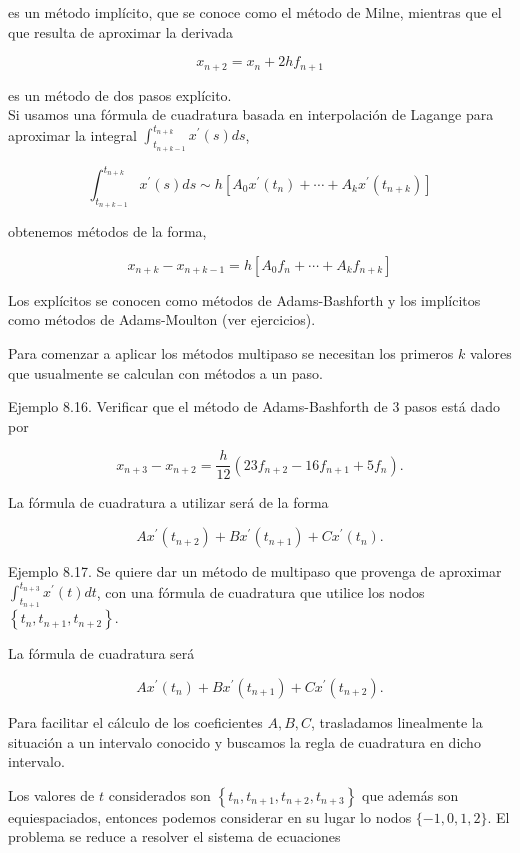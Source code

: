 \documentclass[10pt]{book}
\begin{document}
es un método implícito, que se conoce como el método de Milne, mientras que el que resulta de aproximar la derivada

$$
x_{n+2}=x_{n}+2 h f_{n+1}
$$

es un método de dos pasos explícito.\\
Si usamos una fórmula de cuadratura basada en interpolación de Lagange para aproximar la integral $\int_{t_{n+k-1}}^{t_{n+k}} x^{\prime}(s) d s$,

$$
\int_{t_{n+k-1}}^{t_{n+k}} x^{\prime}(s) d s \sim h\left[A_{0} x^{\prime}\left(t_{n}\right)+\cdots+A_{k} x^{\prime}\left(t_{n+k}\right)\right]
$$

obtenemos métodos de la forma,

$$
x_{n+k}-x_{n+k-1}=h\left[A_{0} f_{n}+\cdots+A_{k} f_{n+k}\right]
$$

Los explícitos se conocen como métodos de Adams-Bashforth y los implícitos como métodos de Adams-Moulton (ver ejercicios).

Para comenzar a aplicar los métodos multipaso se necesitan los primeros $k$ valores que usualmente se calculan con métodos a un paso.

Ejemplo 8.16. Verificar que el método de Adams-Bashforth de 3 pasos está dado por

$$
x_{n+3}-x_{n+2}=\frac{h}{12}\left(23 f_{n+2}-16 f_{n+1}+5 f_{n}\right) .
$$

La fórmula de cuadratura a utilizar será de la forma

$$
A x^{\prime}\left(t_{n+2}\right)+B x^{\prime}\left(t_{n+1}\right)+C x^{\prime}\left(t_{n}\right) .
$$

Ejemplo 8.17. Se quiere dar un método de multipaso que provenga de aproximar $\int_{t_{n+1}}^{t_{n+3}} x^{\prime}(t) d t$, con una fórmula de cuadratura que utilice los nodos $\left\{t_{n}, t_{n+1}, t_{n+2}\right\}$.

La fórmula de cuadratura será

$$
A x^{\prime}\left(t_{n}\right)+B x^{\prime}\left(t_{n+1}\right)+C x^{\prime}\left(t_{n+2}\right) .
$$

Para facilitar el cálculo de los coeficientes $A, B, C$, trasladamos linealmente la situación a un intervalo conocido y buscamos la regla de cuadratura en dicho intervalo.

Los valores de $t$ considerados son $\left\{t_{n}, t_{n+1}, t_{n+2}, t_{n+3}\right\}$ que además son equiespaciados, entonces podemos considerar en su lugar lo nodos $\{-1,0,1,2\}$. El problema se reduce a resolver el sistema de ecuaciones
\end{document}
